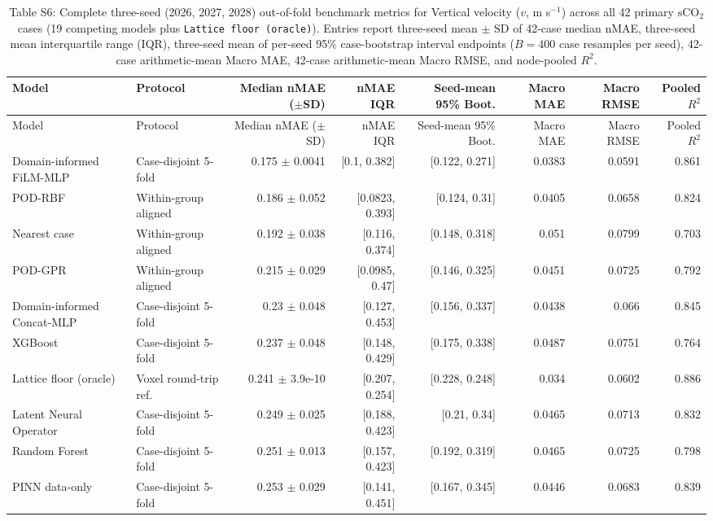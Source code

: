 \begin{landscape}\scriptsize
\begin{longtable}{p{3.8cm}p{2.9cm}rrrrrr}
\caption{Table S6: Complete three-seed (2026, 2027, 2028) out-of-fold benchmark metrics for Vertical velocity ($v$, m s$^{-1}$) across all 42 primary $\mathrm{sCO}_2$ cases (19 competing models plus \texttt{Lattice floor (oracle)}). Entries report three-seed mean $\pm$ SD of 42-case median nMAE, three-seed mean interquartile range (IQR), three-seed mean of per-seed 95\% case-bootstrap interval endpoints ($B=400$ case resamples per seed), 42-case arithmetic-mean Macro MAE, 42-case arithmetic-mean Macro RMSE, and node-pooled $R^2$.}\\
\toprule Model & Protocol & Median nMAE ($\pm$SD) & nMAE IQR & Seed-mean 95\% Boot. & Macro MAE & Macro RMSE & Pooled $R^2$\\
\midrule\endfirsthead
\toprule Model & Protocol & Median nMAE ($\pm$SD) & nMAE IQR & Seed-mean 95\% Boot. & Macro MAE & Macro RMSE & Pooled $R^2$\\
\midrule\endhead
Domain-informed FiLM-MLP & Case-disjoint 5-fold & 0.175 $\pm$ 0.0041 & [0.1, 0.382] & [0.122, 0.271] & 0.0383 & 0.0591 & 0.861 \\
POD-RBF & Within-group aligned & 0.186 $\pm$ 0.052 & [0.0823, 0.393] & [0.124, 0.31] & 0.0405 & 0.0658 & 0.824 \\
Nearest case & Within-group aligned & 0.192 $\pm$ 0.038 & [0.116, 0.374] & [0.148, 0.318] & 0.051 & 0.0799 & 0.703 \\
POD-GPR & Within-group aligned & 0.215 $\pm$ 0.029 & [0.0985, 0.47] & [0.146, 0.325] & 0.0451 & 0.0725 & 0.792 \\
Domain-informed Concat-MLP & Case-disjoint 5-fold & 0.23 $\pm$ 0.048 & [0.127, 0.453] & [0.156, 0.337] & 0.0438 & 0.066 & 0.845 \\
XGBoost & Case-disjoint 5-fold & 0.237 $\pm$ 0.048 & [0.148, 0.429] & [0.175, 0.338] & 0.0487 & 0.0751 & 0.764 \\
Lattice floor (oracle) & Voxel round-trip ref. & 0.241 $\pm$ 3.9e-10 & [0.207, 0.254] & [0.228, 0.248] & 0.034 & 0.0602 & 0.886 \\
Latent Neural Operator & Case-disjoint 5-fold & 0.249 $\pm$ 0.025 & [0.188, 0.423] & [0.21, 0.34] & 0.0465 & 0.0713 & 0.832 \\
Random Forest & Case-disjoint 5-fold & 0.251 $\pm$ 0.013 & [0.157, 0.423] & [0.192, 0.319] & 0.0465 & 0.0725 & 0.798 \\
PINN data-only & Case-disjoint 5-fold & 0.253 $\pm$ 0.029 & [0.141, 0.451] & [0.167, 0.345] & 0.0446 & 0.0683 & 0.839 \\

\end{longtable}
\end{landscape}
